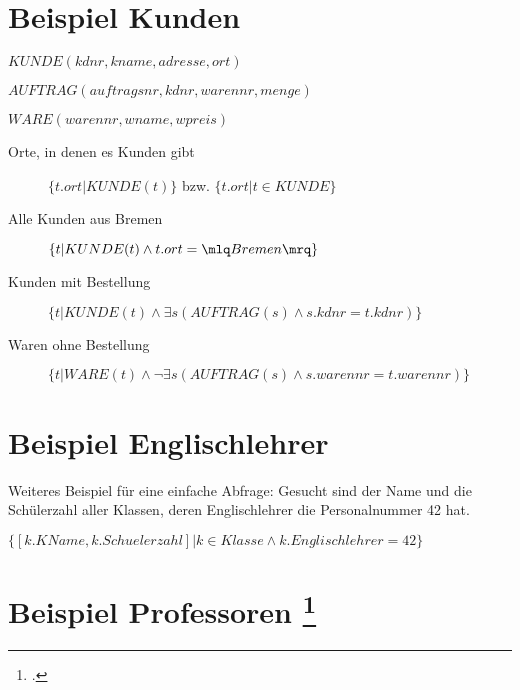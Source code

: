 \documentclass{lehramt-informatik-haupt}
\begin{document}
%

\section{Beispiel Kunden}

\begin{mdframed}
\noindent
$KUNDE (kdnr, kname, adresse, ort)$

\noindent
$AUFTRAG (auftragsnr, kdnr, warennr, menge)$

\noindent
$WARE (warennr, wname, wpreis)$
\end{mdframed}

\begin{description}
\item[Orte, in denen es Kunden gibt]
$\{t.ort | KUNDE(t)\}$ bzw. $\{t.ort | t \in KUNDE \}$

\item[Alle Kunden aus Bremen]
$\{t | KUNDE(t) \land t.ort=\mlq Bremen \mrq \}$

\item[Kunden mit Bestellung]
$\{t | KUNDE(t) \land \exists s(AUFTRAG(s) \land s.kdnr=t.kdnr)\}$

\item[Waren ohne Bestellung]
$\{t | WARE(t) \land \neg\exists s(AUFTRAG(s) \land s.warennr=t.warennr)\}$
\end{description}

\section{Beispiel Englischlehrer}

Weiteres Beispiel für eine einfache Abfrage: Gesucht sind der Name
und die Schülerzahl aller Klassen, deren Englischlehrer die
Personalnummer 42 hat.

$\{[k.KName, k.Schuelerzahl] | k \in Klasse \land k.Englischlehrer = 42\}$

%

\section{Beispiel Professoren
\footcite{net:html:uni-osnabrueck:dbs-skript}}
\end{document}
